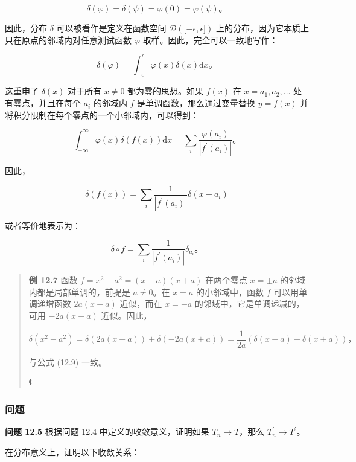 \[\delta(\varphi) = \delta(\psi) = \varphi(0) = \varphi(\psi)。\]

因此，分布 \(\delta\) 可以被看作是定义在函数空间
\(\mathcal{D}\left( \lbrack - \epsilon,\epsilon\rbrack \right)\)
上的分布，因为它本质上只在原点的邻域内对任意测试函数 \(\varphi\)
取样。因此，完全可以一致地写作：

\[\delta(\varphi) = \int_{- \epsilon}^{\epsilon}\varphi(x)\delta(x)\mathrm{d}x。\]

这重申了 \(\delta(x)\) 对于所有 \(x \neq 0\) 都为零的思想。如果 \(f(x)\)
在 \(x = a_{1},a_{2},\ldots\) 处有零点，并且在每个 \(a_{i}\) 的邻域内
\(f\) 是单调函数，那么通过变量替换 \(y = f(x)\)
并将积分限制在每个零点的一个小邻域内，可以得到：

\[\int_{- \infty}^{\infty}\varphi(x)\delta\left( f(x) \right)\mathrm{d}x = \sum_{i}\frac{\varphi\left( a_{i} \right)}{\left| f^{\prime}\left( a_{i} \right) \right|}。\]

因此，

\[\delta\left( f(x) \right) = \sum_{i}\frac{1}{\left| f^{\prime}\left( a_{i} \right) \right|}\delta\left( x - a_{i} \right)\]

或者等价地表示为：

\[\delta \circ f = \sum_{i}\frac{1}{\left| f^{\prime}\left( a_{i} \right) \right|}\delta_{a_{i}}。\]

\begin{quote}
\textbf{例 12.7} 函数 \(f = x^{2} - a^{2} = (x - a)(x + a)\) 在两个零点
\(x = \pm a\) 的邻域内都是局部单调的，前提是 \(a \neq 0\)。在 \(x = a\)
的小邻域中，函数 \(f\) 可以用单调递增函数 \(2a(x - a)\) 近似，而在
\(x = - a\) 的邻域中，它是单调递减的，可用 \(- 2a(x + a)\) 近似。因此，

\[\delta\left( x^{2} - a^{2} \right) = \delta\left( 2a(x - a) \right) + \delta\left( - 2a(x + a) \right) = \frac{1}{2a}\left( \delta(x - a) + \delta(x + a) \right)，\]

与公式 (12.9) 一致。

℄~
\end{quote}

\subsubsection{问题}\label{ux95eeux9898-1}

\textbf{问题 12.5} 根据问题 12.4 中定义的收敛意义，证明如果
\(T_{n} \rightarrow T\)，那么
\(T_{n}^{\prime} \rightarrow T^{\prime}\)。

在分布意义上，证明以下收敛关系：


